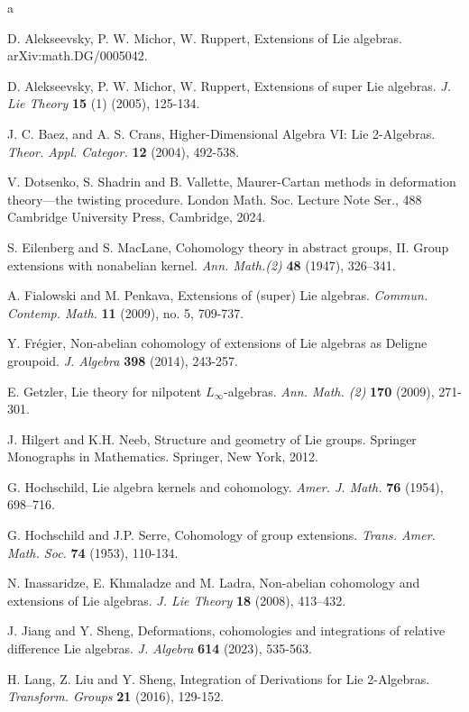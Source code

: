 \documentclass[12pt]{amsart}
\begin{document}
\begin{thebibliography}{a}

D. Alekseevsky, P. W. Michor, W. Ruppert, Extensions of Lie algebras.  arXiv:math.DG/0005042.

D. Alekseevsky, P. W. Michor, W. Ruppert, Extensions of super Lie algebras. \emph{J. Lie Theory} {\bf15} (1) (2005), 125-134.

J. C. Baez, and A. S. Crans, Higher-Dimensional Algebra VI: Lie 2-Algebras. \emph{Theor. Appl. Categor.} {\bf 12} (2004), 492-538.

V. Dotsenko, S. Shadrin and B. Vallette, Maurer-Cartan methods in deformation theory—the twisting procedure. London Math. Soc. Lecture Note Ser., 488 Cambridge University Press, Cambridge, 2024.

S. Eilenberg and S. MacLane, Cohomology theory in abstract groups, II. Group extensions with nonabelian kernel. \emph{Ann. Math.(2)} {\bf 48} (1947), 326–341.

A. Fialowski and M. Penkava, Extensions of (super) Lie algebras.
\emph{Commun. Contemp. Math.} {\bf 11} (2009), no. 5, 709-737.

Y. Fr\'egier, Non-abelian cohomology of extensions of Lie algebras as Deligne groupoid. \emph{J. Algebra} {\bf 398} (2014), 243-257.

E. Getzler, Lie theory for nilpotent $L_\infty$-algebras. \emph{Ann. Math. (2)} {\bf 170} (2009), 271-301.


J. Hilgert and  K.H. Neeb, Structure and geometry of Lie groups. Springer Monographs in Mathematics. Springer, New York, 2012.

G. Hochschild, Lie algebra kernels and cohomology. \emph{Amer. J. Math.} {\bf 76} (1954), 698–716.

G. Hochschild and J.P. Serre, Cohomology of group extensions. \emph{Trans. Amer. Math. Soc.} {\bf 74} (1953), 110-134.

N. Inassaridze, E. Khmaladze and M. Ladra, Non-abelian cohomology and extensions of Lie algebras. \emph{J. Lie Theory} {\bf 18} (2008), 413–432.

J. Jiang and Y. Sheng, Deformations, cohomologies and integrations of relative difference Lie algebras. \emph{J. Algebra} {\bf 614} (2023), 535-563.

H. Lang, Z. Liu and Y. Sheng, Integration of Derivations for Lie 2-Algebras.   \emph{Transform. Groups} {\bf 21} (2016),  129-152.


\end{thebibliography}
\end{document}
